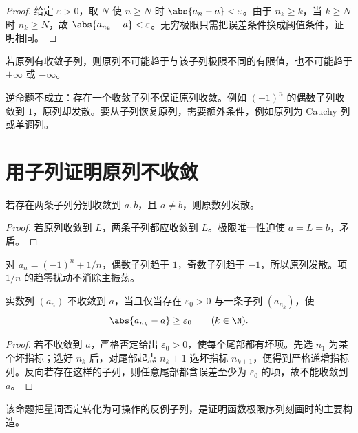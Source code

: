 \begin{proof}
给定 \(\varepsilon>0\)，取 \(N\) 使 \(n\ge N\) 时
\(\abs{a_n-a}<\varepsilon\)。由于 \(n_k\ge k\)，当 \(k\ge N\) 时 \(n_k\ge N\)，故
\(\abs{a_{n_k}-a}<\varepsilon\)。无穷极限只需把误差条件换成阈值条件，证明相同。
\end{proof}

\begin{corollary}
若原列有收敛子列，则原列不可能趋于与该子列极限不同的有限值，也不可能趋于 \(+\infty\) 或 \(-\infty\)。
\end{corollary}

逆命题不成立：存在一个收敛子列不保证原列收敛。例如 \((-1)^n\) 的偶数子列收敛到 \(1\)，原列却发散。要从子列恢复原列，需要额外条件，例如原列为 Cauchy 列或单调列。

\section{用子列证明原列不收敛}

\begin{theorem}[子列判别的反面]
若存在两条子列分别收敛到 \(a,b\)，且 \(a\ne b\)，则原数列发散。
\end{theorem}

\begin{proof}
若原列收敛到 \(L\)，两条子列都应收敛到 \(L\)。极限唯一性迫使 \(a=L=b\)，矛盾。
\end{proof}

\begin{example}
对 \(a_n=(-1)^n+1/n\)，偶数子列趋于 \(1\)，奇数子列趋于 \(-1\)，所以原列发散。项 \(1/n\) 的趋零扰动不消除主振荡。
\end{example}

\begin{proposition}
实数列 \((a_n)\) 不收敛到 \(a\)，当且仅当存在 \(\varepsilon_0>0\) 与一条子列 \((a_{n_k})\)，使
\[
 \abs{a_{n_k}-a}\ge\varepsilon_0\qquad(k\in\N).
\]
\end{proposition}

\begin{proof}
若不收敛到 \(a\)，严格否定给出 \(\varepsilon_0>0\)，使每个尾部都有坏项。先选 \(n_1\) 为某个坏指标；选好 \(n_k\) 后，对尾部起点 \(n_k+1\) 选坏指标 \(n_{k+1}\)，便得到严格递增指标列。反向若存在这样的子列，则任意尾部都含误差至少为 \(\varepsilon_0\) 的项，故不能收敛到 \(a\)。
\end{proof}

该命题把量词否定转化为可操作的反例子列，是证明函数极限序列刻画时的主要构造。

